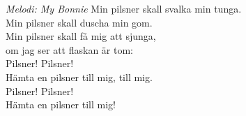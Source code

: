 {\footnotesize\textit{Melodi: My Bonnie}}
\vspace{10pt}
Min pilsner skall svalka min tunga.\\
Min pilsner skall duscha min gom.\\
Min pilsner skall få mig att sjunga,\\
om jag ser att flaskan är tom:\\
Pilsner! Pilsner!\\
Hämta en pilsner till mig, till mig.\\
Pilsner! Pilsner!\\
Hämta en pilsner till mig!
